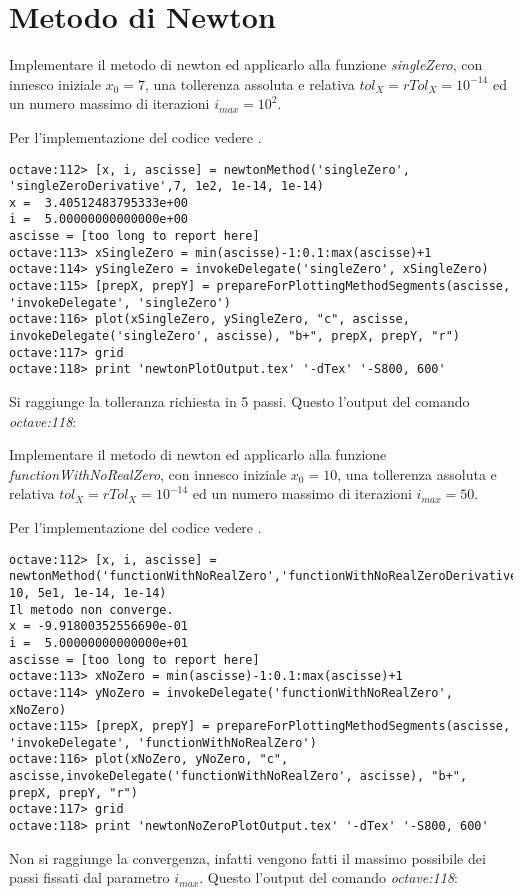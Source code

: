 \section{Metodo di Newton}
\label{sec:metodoDiNewton}

\begin{exercise}
Implementare il metodo di newton ed applicarlo alla funzione \emph{singleZero},
con innesco iniziale $x_{0} = 7$, una tollerenza assoluta e relativa
$tol_{X} = rTol_{X} = 10^{-14}$ ed un numero massimo di iterazioni
$i_{max} = 10^{2}$.
\end{exercise}
Per l'implementazione del codice vedere .
\begin{lstlisting}
octave:112> [x, i, ascisse] = newtonMethod('singleZero', 'singleZeroDerivative',7, 1e2, 1e-14, 1e-14) 
x =  3.40512483795333e+00
i =  5.00000000000000e+00
ascisse = [too long to report here]
octave:113> xSingleZero = min(ascisse)-1:0.1:max(ascisse)+1
octave:114> ySingleZero = invokeDelegate('singleZero', xSingleZero)
octave:115> [prepX, prepY] = prepareForPlottingMethodSegments(ascisse, 'invokeDelegate', 'singleZero')
octave:116> plot(xSingleZero, ySingleZero, "c", ascisse, invokeDelegate('singleZero', ascisse), "b+", prepX, prepY, "r")
octave:117> grid
octave:118> print 'newtonPlotOutput.tex' '-dTex' '-S800, 600'
\end{lstlisting}
Si raggiunge la tolleranza richiesta in 5 passi. Questo l'output del comando
\emph{octave:118}:
\begin{center}

\end{center}

\begin{exercise}
Implementare il metodo di newton ed applicarlo alla funzione \emph{functionWithNoRealZero},
con innesco iniziale $x_{0} = 10$, una tollerenza assoluta e relativa
$tol_{X} = rTol_{X} = 10^{-14}$ ed un numero massimo di iterazioni
$i_{max} = 50$.
\end{exercise}
Per l'implementazione del codice vedere .
\begin{lstlisting}
octave:112> [x, i, ascisse] = newtonMethod('functionWithNoRealZero','functionWithNoRealZeroDerivative', 10, 5e1, 1e-14, 1e-14)
Il metodo non converge.
x = -9.91800352556690e-01
i =  5.00000000000000e+01
ascisse = [too long to report here]
octave:113> xNoZero = min(ascisse)-1:0.1:max(ascisse)+1
octave:114> yNoZero = invokeDelegate('functionWithNoRealZero', xNoZero)
octave:115> [prepX, prepY] = prepareForPlottingMethodSegments(ascisse, 'invokeDelegate', 'functionWithNoRealZero')
octave:116> plot(xNoZero, yNoZero, "c", ascisse,invokeDelegate('functionWithNoRealZero', ascisse), "b+", prepX, prepY, "r")
octave:117> grid
octave:118> print 'newtonNoZeroPlotOutput.tex' '-dTex' '-S800, 600'
\end{lstlisting}
Non si raggiunge la convergenza, infatti vengono fatti il massimo possibile
dei passi fissati dal parametro $i_{max}$. Questo l'output del comando \emph{octave:118}:
\begin{center}

\end{center}

